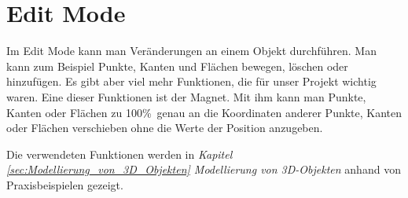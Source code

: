\section{Edit Mode}
Im Edit Mode kann man Veränderungen an einem Objekt durchführen. Man kann zum Beispiel Punkte, Kanten und Flächen bewegen, löschen oder hinzufügen.
Es gibt aber viel mehr Funktionen, die für unser Projekt wichtig waren. Eine dieser Funktionen ist der Magnet. Mit ihm kann man Punkte, Kanten oder Flächen zu 100\%\ genau an
die Koordinaten anderer Punkte, Kanten oder Flächen verschieben ohne die Werte der Position anzugeben.

Die verwendeten Funktionen werden in \textit{Kapitel \ref{sec:Modellierung_von_3D_Objekten} \dq Modellierung von 3D-Objekten\dq} anhand von
Praxisbeispielen gezeigt.

